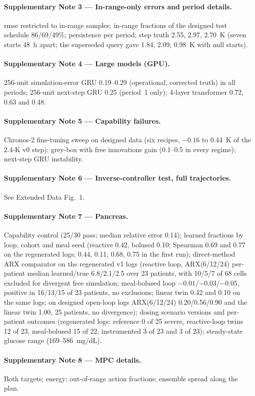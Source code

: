 \documentclass[11pt]{article}
\newcommand{\pancreasarxnumbers}{reactive loop, ARX(6/12/24) per-patient median learned/true 6.8/2.1/2.5 over 23 patients, with 10/5/7 of 68 cells excluded for divergent free simulation; meal-bolused loop $-0.01$/$-0.03$/$-0.05$, positive in 16/13/15 of 23 patients, no exclusions; linear twin 0.42 and 0.10 on the same logs; on designed open-loop logs ARX(6/12/24) 0.20/0.56/0.90 and the linear twin 1.00, 25 patients, no divergence}
\begin{document}
\paragraph{Supplementary Note 3 --- In-range-only errors and period details.} rmse restricted to in-range samples; in-range fractions of the designed test schedule 86/69/49\%; persistence per period; step truth 2.55, 2.97, 2.70~K (seven starts 48~h apart; the superseded query gave 1.84, 2.09, 0.98~K with null starts).

\paragraph{Supplementary Note 4 --- Large models (GPU).} 256-unit simulation-error GRU 0.19--0.29 (operational, corrected truth) in all periods; 256-unit next-step GRU 0.25 (period~1 only); 4-layer transformer 0.72, 0.63 and 0.48.

\paragraph{Supplementary Note 5 --- Capability failures.} Chronos-2 fine-tuning sweep on designed data (six recipes, $-0.16$ to 0.44~K of the 2.4-K v0 step); grey-box with free innovations gain (0.1--0.5 in every regime); next-step GRU instability.

\paragraph{Supplementary Note 6 --- Inverse-controller test, full trajectories.} See Extended Data Fig.~1.
\paragraph{Supplementary Note 7 --- Pancreas.} Capability control (25/30 pass; median relative error 0.14); learned fractions by loop, cohort and meal seed (reactive 0.42, bolused 0.10; Spearman 0.69 and 0.77 on the regenerated logs; 0.44, 0.11, 0.68, 0.75 in the first run); direct-method ARX comparator on the regenerated v1 logs (\pancreasarxnumbers); dosing scenario versions and per-patient outcomes (regenerated logs: reference 0 of 25 severe, reactive-loop twins 12 of 23, meal-bolused 15 of 22, instrumented 3 of 23 and 3 of 23); steady-state glucose range (169--586~mg/dL).

\paragraph{Supplementary Note 8 --- MPC details.} Both targets; energy; out-of-range action fractions; ensemble spread along the plan.
\end{document}
